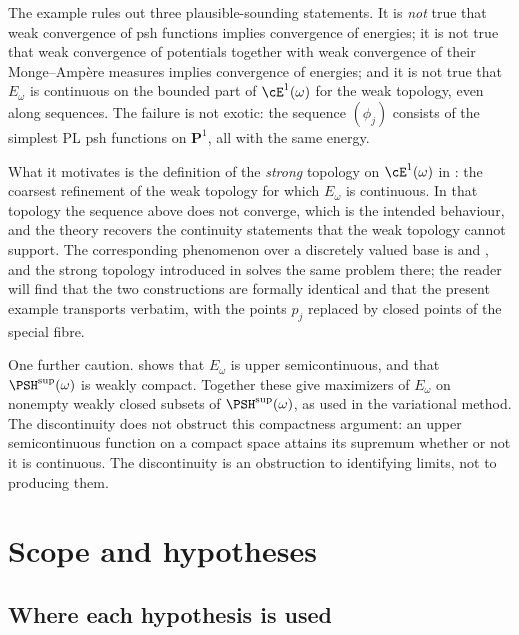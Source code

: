 \begin{remark}
\label{rem:ch46-strong-topology-motivation}
The example rules out three plausible-sounding statements.  It is
\emph{not} true that weak convergence of psh functions implies convergence
of energies; it is not true that weak convergence of potentials together
with weak convergence of their Monge--Amp\`ere measures implies convergence
of energies; and it is not true that $E_\omega$ is continuous on the
bounded part of $\cE^1(\omega)$ for the weak topology, even along
sequences.  The failure is not exotic: the sequence $(\phi_j)$ consists
of the simplest PL psh functions on $\mathbf P^1$, all with the same
energy.

What it motivates is the definition of the \emph{strong} topology on
$\cE^1(\omega)$ in : the coarsest
refinement of the weak topology for which $E_\omega$ is continuous.  In
that topology the sequence above does not converge, which is the intended
behaviour, and the theory recovers the continuity statements that the weak
topology cannot support.  The corresponding phenomenon over a discretely
valued base is  and
, and the strong topology introduced
in  solves the same problem there; the reader will
find that the two constructions are formally identical and that the present
example transports verbatim, with the points $p_j$ replaced by closed
points of the special fibre.

One further caution.   shows that $E_\omega$
is upper semicontinuous, and  that
$\PSH^{\sup}(\omega)$ is weakly compact.  Together these give maximizers of $E_\omega$ on nonempty weakly closed
subsets of $\PSH^{\sup}(\omega)$, as used in the variational method.
The discontinuity does not obstruct this compactness argument: an upper
semicontinuous function on a compact space attains its supremum whether or
not it is continuous.  The discontinuity is an obstruction to identifying
limits, not to producing them.
\end{remark}

\section{Scope and hypotheses}
\label{sec:ch46-scope}

\subsection{Where each hypothesis is used}
\label{sec:ch46-hypothesis-use}

